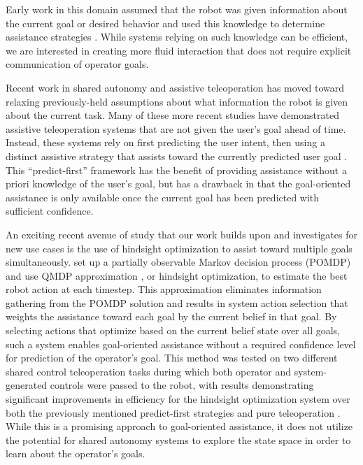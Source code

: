 \documentclass[conference]{IEEEtran}
\begin{document}
Early work in this domain assumed that the robot was given information about the current goal or desired behavior and used this knowledge to determine assistance strategies \cite{aigner1997human, debus2001cooperative, goodrich2001experiments}. While systems relying on such knowledge can be efficient, we are interested in creating more fluid interaction that does not require explicit communication of operator goals.

Recent work in shared autonomy and assistive teleoperation has moved toward relaxing previously-held assumptions about what information the robot is given about the current task. Many of these more recent studies have demonstrated assistive teleoperation systems that are not given the user's goal ahead of time. Instead, these systems rely on first predicting the user intent, then using a distinct assistive strategy that assists toward the currently predicted user goal \cite{dragan2012formalizing, fagg2004extracting, kragic2005human, schultz2017goal, yu2005telemanipulation}. This ``predict-first'' framework has the benefit of providing assistance without a priori knowledge of the user's goal, but has a drawback in that the goal-oriented assistance is only available once the current goal has been predicted with sufficient confidence.

An exciting recent avenue of study that our work builds upon and investigates for new use cases is the use of hindsight optimization to assist toward multiple goals simultaneously. \citet{javdani2015shared} set up a partially observable Markov decision process (POMDP) and use QMDP approximation \cite{littman1995learning}, or hindsight optimization, to estimate the best robot action at each timestep. This approximation eliminates information gathering from the POMDP solution and results in system action selection that weights the assistance toward each goal by the current belief in that goal. By selecting actions that optimize based on the current belief state over all goals, such a system enables goal-oriented assistance without a required confidence level for prediction of the operator's goal. This method was tested on two different shared control teleoperation tasks during which both operator and system-generated controls were passed to the robot, with results demonstrating significant improvements in efficiency for the hindsight optimization system over both the previously mentioned predict-first strategies and pure teleoperation \cite{javdani2018shared}. While this is a promising approach to goal-oriented assistance, it does not utilize the potential for shared autonomy systems to explore the state space in order to learn about the operator's goals.
\end{document}
